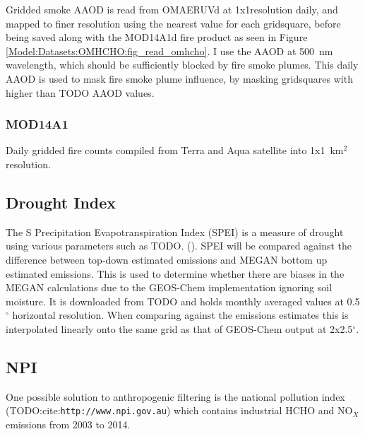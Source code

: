       Gridded smoke AAOD is read from OMAERUVd at 1x1\degr resolution daily, and mapped to finer resolution using the nearest value for each gridsquare, before being saved along with the MOD14A1d fire product as seen in Figure \ref{Model:Datasets:OMHCHO:fig_read_omhcho}.
      I use the AAOD at 500~nm wavelength, which should be sufficiently blocked by fire smoke plumes.
      This daily AAOD is used to mask fire smoke plume influence, by masking gridsquares with higher than TODO AAOD values.
    
    \subsubsection{MOD14A1}
      \label{Model:Datasets:MOD14A1}
      Daily gridded fire counts compiled from Terra and Aqua satellite into 1x1~km$^2$ resolution.
  
  \subsection{Drought Index}
    The S Precipitation Evapotranspiration Index (SPEI) is a measure of drought using various parameters such as TODO. (\textcite{Wang2017}).
    SPEI will be compared against the difference between top-down estimated emissions and MEGAN bottom up estimated emissions. 
    This is used to determine whether there are biases in the MEGAN calculations due to the GEOS-Chem implementation ignoring soil moisture.
    It is downloaded from TODO and holds monthly averaged values at 0.5$^{\circ}$ horizontal resolution.
    When comparing against the emissions estimates this is interpolated linearly onto the same grid as that of GEOS-Chem output at 2x2.5$^{\circ}$.
    
  \subsection{NPI}
    
    One possible solution to anthropogenic filtering is the national pollution index (TODO:cite:\verb|http://www.npi.gov.au|) which contains industrial HCHO and NO$_X$ emissions from 2003 to 2014.
  
